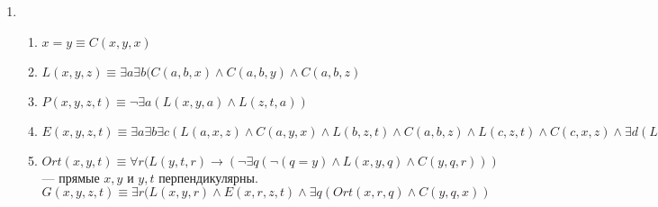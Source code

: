 \documentclass[10pt]{article}
\begin{document}
\begin{enumerate}
	\item 
	\begin{enumerate}
		\item $x=y \equiv C(x, y, x)$
		\item $L(x, y, z) \equiv \exists a \exists b (C(a, b, x) \land C(a, b, y) \land C(a, b, z)$
		\item $P(x, y, z, t) \equiv \neg \exists a (L(x, y, a) \land L(z, t, a))$
		\item $E(x, y, z, t) \equiv \exists a \exists b \exists c (L(a, x, z) \land C(a, y, x) \land L(b, z, t) \land C(a, b, z) \land L(c, z, t) \land C(c, x, z) \land \exists d(L(d, z, t) \land C(c, z, d) \land C(b, t, d)))$
		\item $Ort(x, y, t) \equiv \forall r(L(y, t, r) \to (\neg \exists q(\neg(q=y) \land L(x, y, q) \land C(y, q, r)))$ --- прямые $x, y$ и $y, t$ перпендикулярны.\\
		$G(x, y, z, t) \equiv \exists r(L(x, y, r) \land E(x, r, z, t) \land \exists q (Ort(x, r, q) \land C(y, q, x))$
	\end{enumerate}
\end{enumerate}
\end{document}
